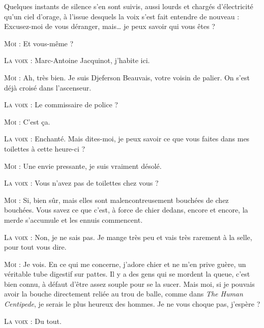 Quelques instants de silence s’en sont suivis, aussi lourds et chargés d’électricité qu’un ciel d’orage, à l’issue desquels la voix s’est fait entendre de nouveau : Excusez-moi de vous déranger, mais… je peux savoir qui vous êtes ?

\begin{dialogue}

\textsc{Moi} : Et vous-même ?

\textsc{La voix} : Marc-Antoine Jacquinot, j’habite ici.

\textsc{Moi} : Ah, très bien. Je suis Djeferson Beauvais, votre voisin de palier. On s’est déjà croisé dans l’ascenseur.

\textsc{La voix} : Le commissaire de police ?

\textsc{Moi} : C’est ça.

\textsc{La voix} : Enchanté. Mais dites-moi, je peux savoir ce que vous faites dans mes toilettes à cette heure-ci ?

\textsc{Moi} : Une envie pressante, je suis vraiment désolé.

\textsc{La voix} : Vous n’avez pas de toilettes chez vous ?

\textsc{Moi} : Si, bien sûr, mais elles sont malencontreusement bouchées de chez bouchées. Vous savez ce que c’est, à force de chier dedans, encore et encore, la merde s’accumule et les ennuis commencent.

\textsc{La voix} : Non, je ne sais pas. Je mange très peu et vais très rarement à la selle, pour tout vous dire.

\textsc{Moi} : Je vois. En ce qui me concerne, j’adore chier et ne m’en prive guère, un véritable tube digestif sur pattes. Il y a des gens qui se mordent la queue, c’est bien connu, à défaut d’être assez souple pour se la sucer. Mais moi, si je pouvais avoir la bouche directement reliée au trou de balle, comme dans \textit{The Human Centipede}, je serais le plus heureux des hommes. Je ne vous choque pas, j’espère ?

%
%
%
\textsc{La voix} : Du tout.


\end{dialogue}
